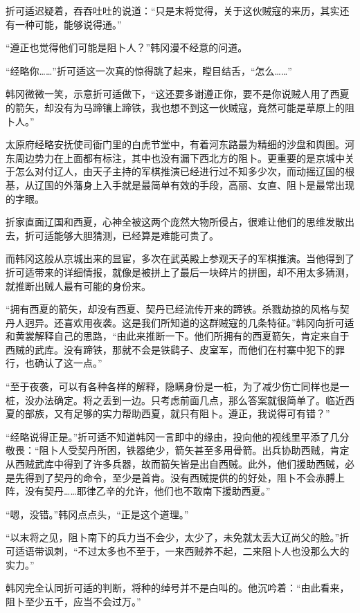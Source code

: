 折可适迟疑着，吞吞吐吐的说道：“只是末将觉得，关于这伙贼寇的来历，其实还有一种可能，能够说得通。”

“遵正也觉得他们可能是阻卜人？”韩冈漫不经意的问道。

“经略你……”折可适这一次真的惊得跳了起来，瞠目结舌，“怎么……”

韩冈微微一笑，示意折可适做下，“这还要多谢遵正你，要不是你说贼人用了西夏的箭矢，却没有为马蹄镶上蹄铁，我也想不到这一伙贼寇，竟然可能是草原上的阻卜人。”

太原府经略安抚使司衙门里的白虎节堂中，有着河东路最为精细的沙盘和舆图。河东周边势力在上面都有标注，其中也没有漏下西北方的阻卜。更重要的是京城中关于怎么对付辽人，由天子主持的军棋推演已经进行过不知多少次，而动摇辽国的根基，从辽国的外藩身上入手就是最简单有效的手段，高丽、女直、阻卜是最常出现的字眼。

折家直面辽国和西夏，心神全被这两个庞然大物所侵占，很难让他们的思维发散出去，折可适能够大胆猜测，已经算是难能可贵了。

而韩冈这般从京城出来的显宦，多次在武英殿上参观天子的军棋推演。当他得到了折可适带来的详细情报，就像是被拼上了最后一块碎片的拼图，却不用太多猜测，就推断出贼人最有可能的身份来。

“拥有西夏的箭矢，却没有西夏、契丹已经流传开来的蹄铁。杀戮劫掠的风格与契丹人迥异。还喜欢用夜袭。这是我们所知道的这群贼寇的几条特征。”韩冈向折可适和黄裳解释自己的思路，“由此来推断一下。他们所拥有的西夏箭矢，肯定来自于西贼的武库。没有蹄铁，那就不会是铁鹞子、皮室军，而他们在村寨中犯下的罪行，也确认了这一点。”

“至于夜袭，可以有各种各样的解释，隐瞒身份是一桩，为了减少伤亡同样也是一桩，没办法确定。将之丢到一边。只考虑前面几点，那么答案就很简单了。临近西夏的部族，又有足够的实力帮助西夏，就只有阻卜。遵正，我说得可有错？”

“经略说得正是。”折可适不知道韩冈一言即中的缘由，投向他的视线里平添了几分敬畏：“阻卜人受契丹所困，铁器绝少，箭矢甚至多用骨箭。出兵协助西贼，肯定从西贼武库中得到了许多兵器，故而箭矢皆是出自西贼。此外，他们援助西贼，必是先得到了契丹的命令，至少是首肯。没有西贼提供的的好处，阻卜不会赤膊上阵，没有契丹……耶律乙辛的允许，他们也不敢南下援助西夏。”

“嗯，没错。”韩冈点点头，“正是这个道理。”

“以末将之见，阻卜南下的兵力当不会少，太少了，未免就太丢大辽尚父的脸。”折可适语带讽刺，“不过太多也不至于，一来西贼养不起，二来阻卜人也没那么大的实力。”

韩冈完全认同折可适的判断，将种的绰号并不是白叫的。他沉吟着：“由此看来，阻卜至少五千，应当不会过万。”


